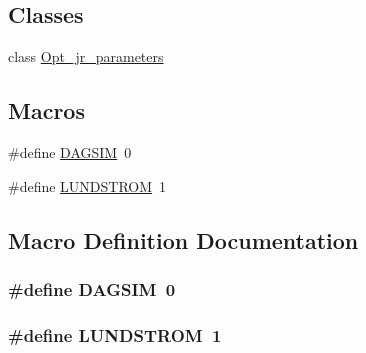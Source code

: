 \subsection*{Classes}
\begin{DoxyCompactItemize}
\item 
class \hyperlink{classOpt__jr__parameters}{Opt\-\_\-jr\-\_\-parameters}
\end{DoxyCompactItemize}
\subsection*{Macros}
\begin{DoxyCompactItemize}
\item 
\#define \hyperlink{opt__jr__parameters_8hh_a56a8cb264c1d9cc7d95eec734118805b}{D\-A\-G\-S\-I\-M}~0
\item 
\#define \hyperlink{opt__jr__parameters_8hh_a9dafe00da949db8c917f627d608b5c22}{L\-U\-N\-D\-S\-T\-R\-O\-M}~1
\end{DoxyCompactItemize}


\subsection{Macro Definition Documentation}
\hypertarget{opt__jr__parameters_8hh_a56a8cb264c1d9cc7d95eec734118805b}{
\subsubsection[{D\-A\-G\-S\-I\-M}]{\setlength{\rightskip}{0pt plus 5cm}\#define D\-A\-G\-S\-I\-M~0}}\label{opt__jr__parameters_8hh_a56a8cb264c1d9cc7d95eec734118805b}
\hypertarget{opt__jr__parameters_8hh_a9dafe00da949db8c917f627d608b5c22}{
\subsubsection[{L\-U\-N\-D\-S\-T\-R\-O\-M}]{\setlength{\rightskip}{0pt plus 5cm}\#define L\-U\-N\-D\-S\-T\-R\-O\-M~1}}\label{opt__jr__parameters_8hh_a9dafe00da949db8c917f627d608b5c22}
